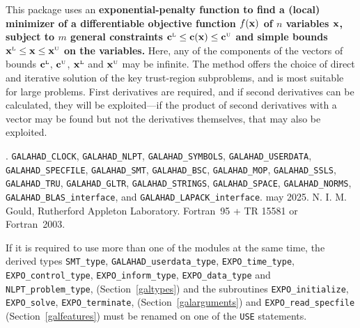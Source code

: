 \documentclass{galahad}
\newcommand{\packagename}{EXPO}
\newcommand{\fullpackagename}{\libraryname\_\packagename}
\newcommand{\sL}{\s{L}}
\newcommand{\sU}{\s{U}}
\begin{document}
\galheader


\galsummary
This package uses an {\bf exponential-penalty function to find a (local)
minimizer of a differentiable objective function $f({\mathbf{x}})$
of $n$ variables ${\mathbf{x}}$, subject 
to $m$ general constraints $\bmc\sL \leq \bmc(\bmx) \leq \bmc\sU$
and simple bounds $\bmx\sL \leq \bmx \leq \bmx\sU$ on the variables.}
Here, any of the components of the vectors of bounds 
$\bmc\sL$, $\bmc\sU$, $\bmx\sL$ and $\bmx\sU$ may be infinite. 
The method offers the choice of direct
and iterative solution of the key trust-region subproblems, and
is most suitable for large problems. First derivatives are required,
and if second derivatives can be calculated, they will be exploited---if
the product of second derivatives with a vector may be found but
not the derivatives themselves, that may also be exploited.


\galattributes
\galversions{\tt  \fullpackagename\_single, \fullpackagename\_double}.
\galuses
{\tt GALAHAD\_CLOCK},
{\tt GALAHAD\_NLPT},
{\tt GALAHAD\_SY\-M\-BOLS},
{\tt GALAHAD\_USERDATA},
{\tt GALAHAD\_SPECFILE},
{\tt GALAHAD\_SMT},
{\tt GALAHAD\_BSC},
{\tt GALAHAD\_MOP},
{\tt GALAHAD\_\-SSLS},
{\tt GALAHAD\_TRU},
{\tt GALAHAD\_GLTR},
{\tt GALAHAD\_STRINGS},
{\tt GALAHAD\_SPACE},
{\tt GALAHAD\_\-NORMS},
{\tt GALAHAD\_BLAS\_interface},
and
{\tt GALAHAD\_LAPACK\_interface}.
\galdate may 2025.
\galorigin N. I. M. Gould, Rutherford Appleton Laboratory.
\gallanguage Fortran~95 + TR 15581 or Fortran~2003.


\galhowto



\noindent
If it is required to use more than one of the modules at the same time, 
the derived types
{\tt SMT\_type},
{\tt GALAHAD\_userdata\_\-type},
{\tt \packagename\_time\_\-type},
{\tt \packagename\_control\_type},
{\tt \packagename\_inform\_type},
{\tt \packagename\_data\_type}
and
{\tt NLPT\_problem\_type},
(Section~\ref{galtypes})
and the subroutines
{\tt \packagename\_initialize},
{\tt \packagename\_\-solve},
{\tt \packagename\_terminate},
(Section~\ref{galarguments})
and
{\tt \packagename\_read\_specfile}
(Section~\ref{galfeatures})
must be renamed on one of the {\tt USE} statements.

\end{document}
